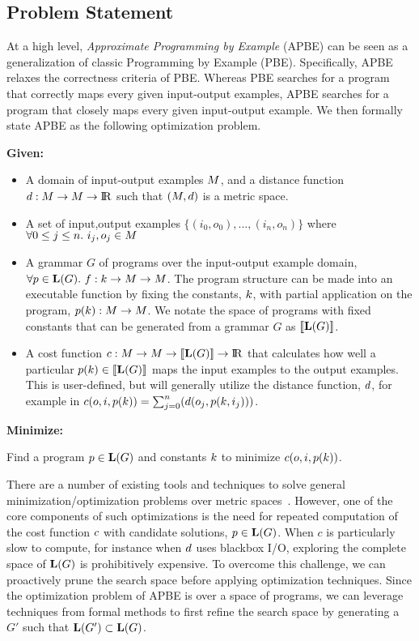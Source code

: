 
\subsection{Problem Statement}
At a high level, \textit{Approximate Programming by Example} (APBE) can be seen as a generalization of classic Programming by Example (PBE).
Specifically, APBE relaxes the correctness criteria of PBE.
Whereas PBE searches for a program that correctly maps every given input-output examples, APBE searches for a program that closely maps every given input-output example.
We then formally state APBE as the following optimization problem.

\noindent\textbf{Given:}
\begin{itemize}[topsep=0pt]
  \item A domain of input-output examples $M$, and a distance function $d:M \to M \to {\rm I\!R}$ such that $(M,{d})$ is a metric space.
  \item A set of input,output examples $\{(i_0,o_0),...,(i_n,o_n)\}$ where $\forall 0 \leq j \leq n.\ i_j,o_j \in M$
  \item A grammar $G$ of programs over the input-output example domain, $\forall p \in \mathbf{L}(G).\ f: {k} \to M \to M$. 
    The program structure can be made into an executable function by fixing the constants, ${k}$, with partial application on the program, $p({k}): M \to M$. We notate the space of programs with fixed constants that can be generated from a grammar $G$ as $[\![\mathbf{L}(G)]\!]$.
  \item A cost function ${c} : M \to M \to [\![\mathbf{L}(G)]\!] \to {\rm I\!R}$ that calculates how well a particular $p({k}) \in [\![\mathbf{L}(G)]\!]$ maps the input examples to the output examples. This is user-defined, but will generally utilize the distance function, ${d}$, for example in ${c}(o,i,p({k})) = \sum_{j=0}^{n} ({d}(o_j,p({k},i_j)))$.
\end{itemize}
\textbf{Minimize:}

Find a program $p \in \mathbf{L}(G)$ and constants ${k}$ to minimize ${c}(o,i,p({k}))$.
\vspace{\baselineskip}

There are a number of existing tools and techniques to solve general minimization/optimization problems over metric spaces~\cite{optmizationTextbook}.
However, one of the core components of such optimizations is the need for repeated computation of the cost function ${c}$ with candidate solutions, $p \in \mathbf{L}(G)$.
When $c$ is particularly slow to compute, for instance when ${d}$ uses blackbox I/O, exploring the complete space of $\mathbf{L}(G)$ is prohibitively expensive.
To overcome this challenge, we can proactively prune the search space before applying optimization techniques.
Since the optimization problem of APBE is over a space of programs, we can leverage techniques from formal methods to first refine the search space by generating a $G'$ such that $\mathbf{L}(G') \subset \mathbf{L}(G)$.

